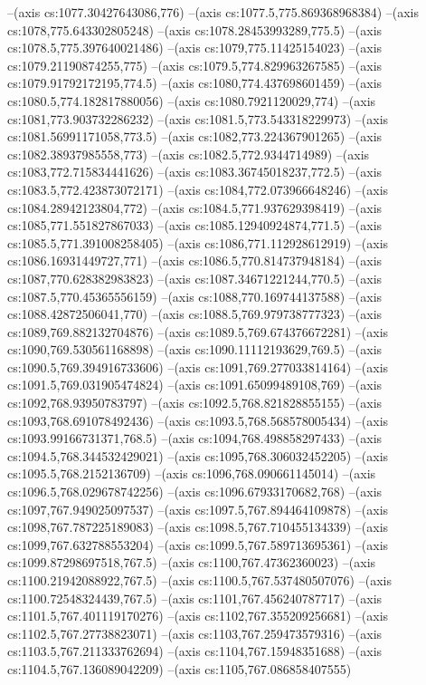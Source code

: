 --(axis cs:1077.30427643086,776)
--(axis cs:1077.5,775.869368968384)
--(axis cs:1078,775.643302805248)
--(axis cs:1078.28453993289,775.5)
--(axis cs:1078.5,775.397640021486)
--(axis cs:1079,775.11425154023)
--(axis cs:1079.21190874255,775)
--(axis cs:1079.5,774.829963267585)
--(axis cs:1079.91792172195,774.5)
--(axis cs:1080,774.437698601459)
--(axis cs:1080.5,774.182817880056)
--(axis cs:1080.7921120029,774)
--(axis cs:1081,773.903732286232)
--(axis cs:1081.5,773.543318229973)
--(axis cs:1081.56991171058,773.5)
--(axis cs:1082,773.224367901265)
--(axis cs:1082.38937985558,773)
--(axis cs:1082.5,772.9344714989)
--(axis cs:1083,772.715834441626)
--(axis cs:1083.36745018237,772.5)
--(axis cs:1083.5,772.423873072171)
--(axis cs:1084,772.073966648246)
--(axis cs:1084.28942123804,772)
--(axis cs:1084.5,771.937629398419)
--(axis cs:1085,771.551827867033)
--(axis cs:1085.12940924874,771.5)
--(axis cs:1085.5,771.391008258405)
--(axis cs:1086,771.112928612919)
--(axis cs:1086.16931449727,771)
--(axis cs:1086.5,770.814737948184)
--(axis cs:1087,770.628382983823)
--(axis cs:1087.34671221244,770.5)
--(axis cs:1087.5,770.45365556159)
--(axis cs:1088,770.169744137588)
--(axis cs:1088.42872506041,770)
--(axis cs:1088.5,769.979738777323)
--(axis cs:1089,769.882132704876)
--(axis cs:1089.5,769.674376672281)
--(axis cs:1090,769.530561168898)
--(axis cs:1090.11112193629,769.5)
--(axis cs:1090.5,769.394916733606)
--(axis cs:1091,769.277033814164)
--(axis cs:1091.5,769.031905474824)
--(axis cs:1091.65099489108,769)
--(axis cs:1092,768.93950783797)
--(axis cs:1092.5,768.821828855155)
--(axis cs:1093,768.691078492436)
--(axis cs:1093.5,768.568578005434)
--(axis cs:1093.99166731371,768.5)
--(axis cs:1094,768.498858297433)
--(axis cs:1094.5,768.344532429021)
--(axis cs:1095,768.306032452205)
--(axis cs:1095.5,768.2152136709)
--(axis cs:1096,768.090661145014)
--(axis cs:1096.5,768.029678742256)
--(axis cs:1096.67933170682,768)
--(axis cs:1097,767.949025097537)
--(axis cs:1097.5,767.894464109878)
--(axis cs:1098,767.787225189083)
--(axis cs:1098.5,767.710455134339)
--(axis cs:1099,767.632788553204)
--(axis cs:1099.5,767.589713695361)
--(axis cs:1099.87298697518,767.5)
--(axis cs:1100,767.47362360023)
--(axis cs:1100.21942088922,767.5)
--(axis cs:1100.5,767.537480507076)
--(axis cs:1100.72548324439,767.5)
--(axis cs:1101,767.456240787717)
--(axis cs:1101.5,767.401119170276)
--(axis cs:1102,767.355209256681)
--(axis cs:1102.5,767.27738823071)
--(axis cs:1103,767.259473579316)
--(axis cs:1103.5,767.211333762694)
--(axis cs:1104,767.15948351688)
--(axis cs:1104.5,767.136089042209)
--(axis cs:1105,767.086858407555)
